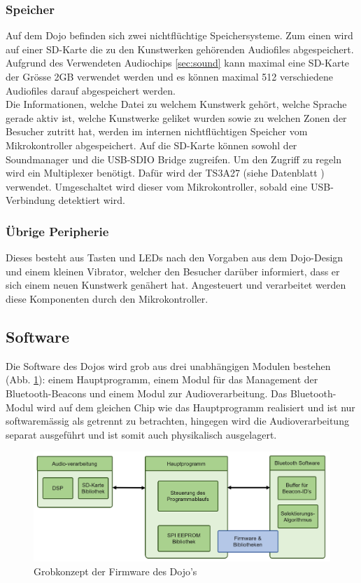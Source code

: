 \documentclass[10pt,a4paper,oneside]{99_fhnwreport}
\begin{document}
\subsubsection{Speicher}\label{sec:speicher}
Auf dem Dojo befinden sich zwei nichtflüchtige Speichersysteme.  Zum einen wird auf einer SD-Karte die zu den Kunstwerken gehörenden Audiofiles abgespeichert. Aufgrund des Verwendeten Audiochips \ref{sec:sound} kann maximal eine SD-Karte der Grösse 2GB verwendet werden und es können maximal 512 verschiedene Audiofiles darauf abgespeichert werden.\\
Die Informationen, welche Datei zu welchem Kunstwerk gehört, welche Sprache gerade aktiv ist, welche Kunstwerke geliket wurden sowie zu welchen Zonen der Besucher zutritt hat, werden im internen nichtflüchtigen Speicher vom Mikrokontroller abgespeichert. Auf die SD-Karte können sowohl der Soundmanager und die USB-SDIO Bridge zugreifen. Um den Zugriff zu regeln wird ein Multiplexer benötigt. Dafür wird der TS3A27 (siehe Datenblatt \cite{TS3A27518E}) verwendet. Umgeschaltet wird dieser vom Mikrokontroller, sobald eine USB-Verbindung detektiert wird.

\subsubsection{Übrige Peripherie}
Dieses besteht aus Tasten und LEDs nach den Vorgaben aus dem Dojo-Design und einem kleinen Vibrator, welcher den Besucher darüber informiert, dass er sich einem neuen Kunstwerk genähert hat. Angesteuert und verarbeitet werden diese Komponenten durch den Mikrokontroller.

\subsection{Software} \label{sec:software}

Die Software des Dojos wird grob aus drei unabhängigen Modulen bestehen (Abb. \ref{fig:grobkonzept}): einem Hauptprogramm, einem Modul für das Management der Bluetooth-Beacons und einem Modul zur Audioverarbeitung. Das Bluetooth-Modul wird auf dem gleichen Chip wie das Hauptprogramm realisiert und ist nur softwaremässig als getrennt zu betrachten, hingegen wird die Audioverarbeitung separat ausgeführt und ist somit auch physikalisch ausgelagert.

\begin{figure}[htb]
\includegraphics[width=\textwidth]{grobkonzept_software.png}
\caption{Grobkonzept der Firmware des Dojo's} %
\label{fig:grobkonzept}
\end{figure}
\end{document}
